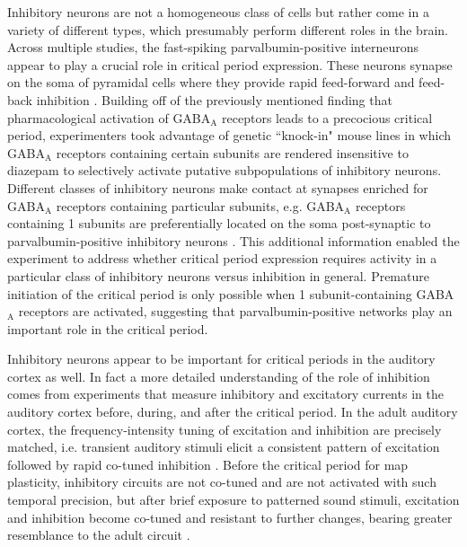 Inhibitory neurons are not a homogeneous class of cells but rather come in a variety of different types, which presumably perform different roles in the brain. Across multiple studies, the fast-spiking parvalbumin-positive interneurons appear to play a crucial role in critical period expression. These neurons synapse on the soma of pyramidal cells where they provide rapid feed-forward and feed-back inhibition \cite{Markram2004}. Building off of the previously mentioned finding that pharmacological activation of GABA$_\mathrm{A}$ receptors leads to a precocious critical period, experimenters took advantage of genetic ``knock-in" mouse lines in which GABA$_\mathrm{A}$ receptors containing certain subunits are rendered insensitive to diazepam to selectively activate putative subpopulations of inhibitory neurons. Different classes of inhibitory neurons make contact at synapses enriched for GABA$_\mathrm{A}$ receptors containing particular subunits, e.g. GABA$_\mathrm{A}$ receptors containing \textalpha{}1 subunits are preferentially located on the soma post-synaptic to parvalbumin-positive inhibitory neurons \cite{Fagiolini2004}. This additional information enabled the experiment to address whether critical period expression requires activity in a particular class of inhibitory neurons versus inhibition in general.  Premature initiation of the critical period is only possible when \textalpha{}1 subunit-containing GABA$_\mathrm{A}$ receptors are activated, suggesting that parvalbumin-positive networks play an important role in the critical period.

Inhibitory neurons appear to be important for critical periods in the auditory cortex as well. In fact a more detailed understanding of the role of inhibition comes from experiments that measure inhibitory and excitatory currents in the auditory cortex before, during, and after the critical period. In the adult auditory cortex, the frequency-intensity tuning of excitation and inhibition are precisely matched, i.e. transient auditory stimuli elicit a consistent pattern of excitation followed by rapid co-tuned inhibition \cite{Wehr2003, Wehr2005}. Before the critical period for map plasticity, inhibitory circuits are not co-tuned and are not activated with such temporal precision, but after brief exposure to patterned sound stimuli, excitation and inhibition become co-tuned and resistant to further changes, bearing greater resemblance to the adult circuit \cite{Dorrn2010}.

